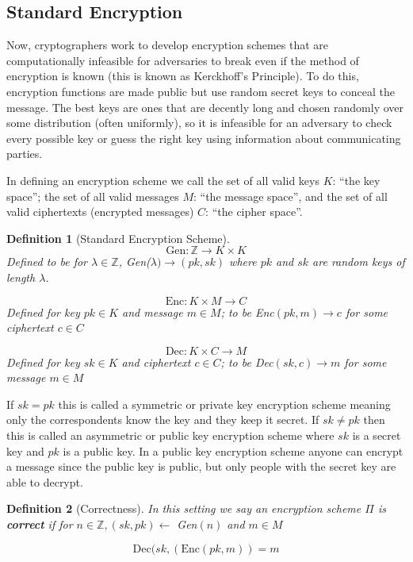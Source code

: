 \documentclass[12pt,twoside]{reedthesis}
\newtheorem{definition}{Definition}
\begin{document}
    \subsection{Standard Encryption}
    Now, cryptographers work to develop encryption schemes that are computationally infeasible for adversaries to break even if the method of encryption is known (this is known as Kerckhoff's Principle). To do this, encryption functions are made public but use random secret keys to conceal the message. The best keys are ones that are decently long and chosen randomly over some distribution (often uniformly), so it is infeasible for an adversary to check every possible key or guess the right key using information about communicating parties.
       \par In defining an encryption scheme we call the set of all valid keys $K$: ``the key space''; the set of all valid messages $M$: ``the message space'', and the set of all valid ciphertexts (encrypted messages) $C$: ``the cipher space''.

\begin{definition}[Standard Encryption Scheme]
     
 
 $$\text{Gen}:\mathbb{Z} \rightarrow K \times K$$
 Defined to be for $\lambda \in \mathbb{Z}$, Gen($\lambda ) \rightarrow (pk,sk)$ where $pk$ and $sk$ are random keys of length $\lambda$.
 
  $$\text{Enc}:K \times M \rightarrow C$$
Defined for key $pk\in K$ and message $m\in M$; to be Enc$(pk,m) \rightarrow c$ for some ciphertext $c\in C$
 
 $$\text{Dec}:K \times C \rightarrow M$$
 Defined for key $sk \in K$ and ciphertext $c\in C$; to be Dec$(sk,c) \rightarrow m$ for some message $m\in M$
 
 \end{definition}
 
 
\par If $sk = pk$ this is called a symmetric or private key encryption scheme meaning only the correspondents know the key and they keep it secret. If $sk \not= pk$ then this is called an asymmetric or public key encryption scheme where $sk$ is a secret key and $pk$ is a public key. In a public key encryption scheme anyone can encrypt a message since the public key is public, but only people with the secret key are able to decrypt.


\begin{definition}[Correctness]
In this setting we say an encryption scheme $\Pi$ is \textbf{correct} if for $n\in \mathbb{Z} , (sk,pk) \leftarrow$ Gen$(n)$ and $m\in M$ 

$$\text{Dec}(sk, (\text{Enc}(pk,m)) = m$$
\end{definition}
\end{document}
